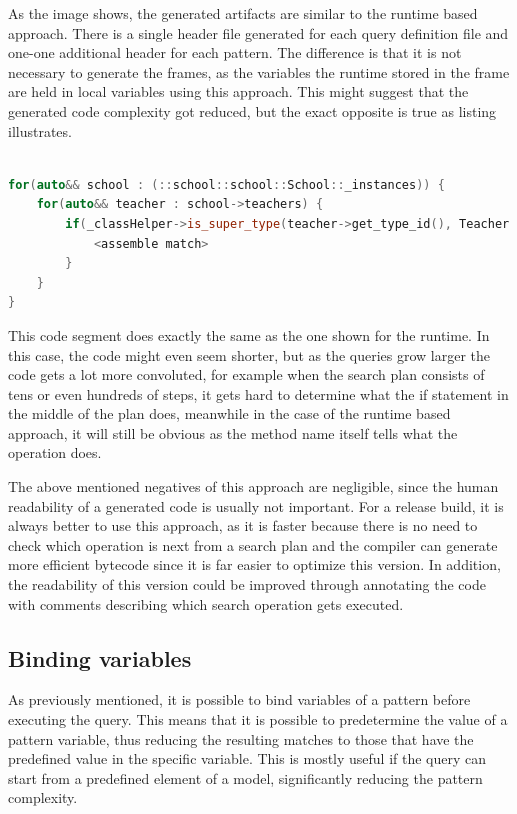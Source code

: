 As the image shows, the generated artifacts are similar to the runtime based
approach. There is a single header file generated for each query definition
file and one-one additional header for each pattern. The difference is that it
is not necessary to generate the frames, as the variables the runtime stored in
the frame are held in local variables using this approach. This might suggest
that the generated code complexity got reduced, but the exact opposite is true
as listing  illustrates.

\begin{lstlisting}[frame=single,float=!ht,language=C++,
label=listing:tos_gen_iter, caption=Segment of the generated code for
teachers of school]

for(auto&& school : (::school::school::School::_instances)) {
	for(auto&& teacher : school->teachers) {
		if(_classHelper->is_super_type(teacher->get_type_id(), Teacher::type_id)) { 
			<assemble match> 
		}
	}
}

\end{lstlisting}

This code segment does exactly the same as the one shown for the runtime. In
this case, the code might even seem shorter, but as the queries grow larger the
code gets a lot more convoluted, for example when the search plan consists of
tens or even hundreds of steps, it gets hard to determine what the if statement
in the middle of the plan does, meanwhile in the case of the runtime based
approach, it will still be obvious as the method name itself tells what the
operation does. 

The above mentioned negatives of this approach are negligible, since the human
readability of a generated code is usually not important. For a release build,
it is always better to use this approach, as it is faster because there is no
need to check which operation is next from a search plan and the compiler can
generate more efficient bytecode since it is far easier to optimize this
version. In addition, the readability of this version could be improved through
annotating the code with comments describing which search operation gets
executed.

\subsection{Binding variables}\label{sect:binding_variables}

As previously mentioned, it is possible to bind variables of a pattern before
executing the query. This means that it is possible to predetermine the value of
a pattern variable, thus reducing the resulting matches to those that have the
predefined value in the specific variable. This is mostly useful if the query
can start from a predefined element of a model, significantly reducing the
pattern complexity.

